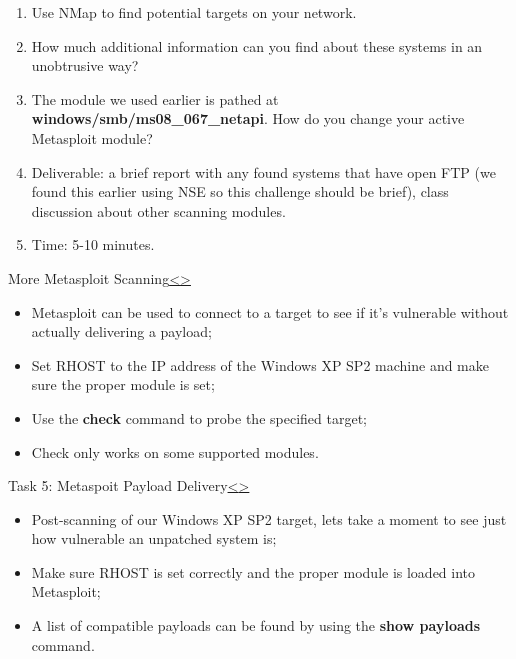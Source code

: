 \documentclass[12pt]{extarticle}
\newenvironment{instructionblock}{\Large\bgroup}{\egroup}
\begin{document}
\begin{enumerate}
	\item Use NMap to find potential targets on your network.
	\item How much additional information can you find about these systems in an unobtrusive way?
	\item The module we used earlier is pathed at \textbf{windows/smb/ms08\_067\_netapi}. How do you change your active Metasploit module?
	\item Deliverable: a brief report with any found systems that have open FTP (we found this earlier using NSE so this challenge should be brief), class discussion about other scanning modules.
	\item Time: 5-10 minutes.
\end{enumerate}
\pagebreak

\begin{slide}{More Metasploit Scanning\cite{b1}}{\hyperref[slide 15]{\textless}\hyperref[slide 17]{\textgreater}}
\vskip 5pt
\begin{instructionblock}
\begin{itemize}
	\item Metasploit can be used to connect to a target to see if it's vulnerable without actually delivering a payload;
	\item Set RHOST to the IP address of the Windows XP SP2 machine and make sure the proper module is set;
	\item Use the \textbf{check} command to probe the specified target;
	\item Check only works on some supported modules.
\end{itemize}
\end{instructionblock}
\end{slide}


\pagebreak
\begin{slide}{Task 5: Metaspoit Payload Delivery}{\hyperref[slide 16]{\textless}\hyperref[slide 18]{\textgreater}}
\vskip 5pt
\begin{instructionblock}
	\begin{itemize}
		\item Post-scanning of our Windows XP SP2 target, lets take a moment to see just how vulnerable an unpatched system is;
		\item Make sure RHOST is set correctly and the proper module is loaded into Metasploit;
		\item A list of compatible payloads can be found by using the \textbf{show payloads} command.
	\end{itemize}
\end{instructionblock}
\end{slide}
\end{document}
